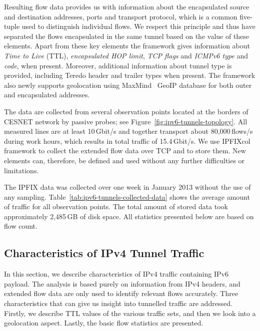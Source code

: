 Resulting flow data provides us with information about the encapsulated source and destination addresses, ports and transport protocol, which is a common five-tuple used to distinguish individual flows. We respect this principle and thus have separated the flows encapsulated in the same tunnel based on the value of these elements. Apart from these key elements the framework gives information about \emph{Time to Live} (TTL), \emph{encapsulated HOP limit}, \emph{TCP flags} and \emph{ICMPv6 type} and \emph{code}, when present. Moreover, additional information about tunnel type is provided, including Teredo header and trailer types when present. The framework also newly supports geolocation using MaxMind~\cite{MaxMind-2013-MaxMind} GeoIP database for both outer and encapsulated addresses.

The data are collected from several observation points located at the borders of CESNET network by passive probes; see Figure~\ref{fig:ipv6-tunnels-topology}. All measured lines are at least 10\,Gbit/s and together transport about 80,000\,flows/s during work hours, which results in total traffic of 15.4\,Gbit/s. We use IPFIXcol~\cite{Velan-2012-Flow} framework to collect the extended flow data over TCP and to store them. New elements can, therefore, be defined and used without any further difficulties or limitations.

The IPFIX data was collected over one week in January 2013 without the use of any sampling. Table~\ref{tab:ipv6-tunnels-collected-data} shows the average amount of traffic for all observation points. The total amount of stored data took approximately 2,485\,GB of disk space. All statistics presented below are based on flow count.

\subsection{Characteristics of IPv4 Tunnel Traffic} \label{subsec:ipv6-tunnels-outer-traffic-evaluation}

In this section, we describe characteristics of IPv4 traffic containing IPv6 payload. The analysis is based purely on information from IPv4 headers, and extended flow data are only used to identify relevant flows accurately. Three characteristics that can give us insight into tunnelled traffic are addressed. Firstly, we describe TTL values of the various traffic sets, and then we look into a geolocation aspect. Lastly, the basic flow statistics are presented.


